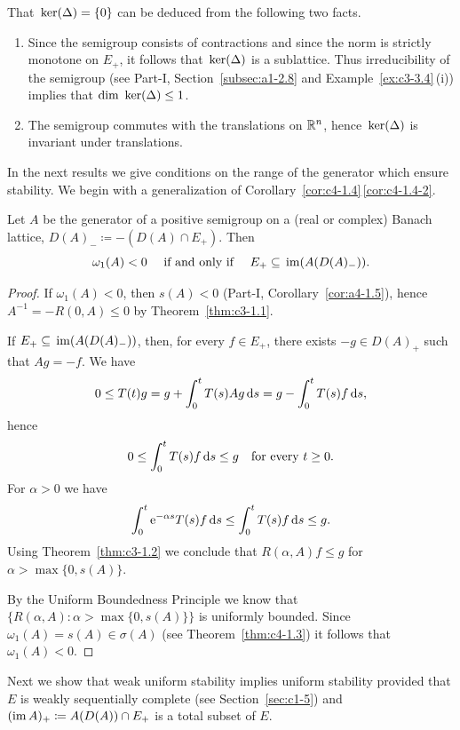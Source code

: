 That $\mathop{}\mathrm{ker}(\Delta) = \{0\}$ can be deduced from the following two facts.
\begin{enumerate}[\upshape (i), wide, labelindent=.25em]
\item 
Since the semigroup consists of contractions and since the norm is strictly monotone on $E_{+}$, it follows that $\mathop{}\mathrm{ker}(\Delta)$ is a sublattice.
Thus irreducibility of the semigroup (see Part-I, Section~\ref{subsec:a1-2.8} and Example~\ref{ex:c3-3.4}\,(i)) implies that $\dim \Kern\Delta \leq 1$.

\item 
The semigroup commutes with the translations on $\mathbb{R}^{n}$, hence $\mathop{}\mathrm{ker}(\Delta)$ is invariant under translations.

\end{enumerate}
In the next results we give conditions on the range of the generator which ensure stability.
We begin with a generalization of Corollary~\ref{cor:c4-1.4}\,\ref{cor:c4-1.4-2}.
\begin{proposition}\label{prop:c4-1.6}
%
Let $A$ be the generator of a positive semigroup on a (real or complex) Banach lattice, $D(A)_{-} \coloneqq -(D(A) \cap E_{+})$.
Then 
\[ 
\text{$\omega_{1}(A) < 0 $ \quad \text{if and only if} \quad $E_{+} \subseteq \mathop{}\mathrm{im}(A(D(A)_{-}))$.}
\]
\end{proposition}
\begin{proof}
If\/ $\omega_{1}(A) < 0$, then $s(A) < 0$ (Part-I, Corollary~\ref{cor:a4-1.5}), hence $A^{-1} = -R(0,A) \leq 0$ by Theorem~\ref{thm:c3-1.1}.

If\/ $E_{+} \subseteq \mathop{}\mathrm{im}(A(D(A)_{-}))$, then, for every $f \in E_{+}$, there exists $-g \in D(A)_{+}$ such that $Ag = -f$.
We have 
\[
0 \leq T(t)g = g + \int_{0}^{t} T(s)Ag \ds = g - \int_{0}^{t} T(s)f \ds,
\]
hence 
\[
0 \leq \int_{0}^{t} T(s)f \ds \leq g 
\quad \text{for every $t \geq 0$.}
\]
For $\alpha > 0$ we have 
\[
\int_{0}^{t} \eu^{-\alpha s}T(s)f \ds \leq \int_{0}^{t} T(s)f \ds \leq g .
\]
Using Theorem~\ref{thm:c3-1.2}  we conclude that $R(\alpha,A)f \leq g$ for $\alpha > \max\{0,s(A)\}$.

By the Uniform Boundedness Principle we know that $\{R(\alpha,A) \colon \alpha > \max\{0,s(A)\}\}$ is uniformly bounded.
Since $\omega_{1}(A) = s(A) \in \sigma(A)$ (see Theorem~\ref{thm:c4-1.3}) it follows that $\omega_{1}(A) < 0$.
\end{proof}
Next we show that weak uniform stability implies uniform stability provided that $E$ is weakly sequentially complete (see Section~\ref{sec:c1-5}) and $(\mathop{}\!\mathrm{im}\,{A})_{+} \coloneqq A(D(A)) \cap E_{+}$ is a total subset of\/ $E$.
